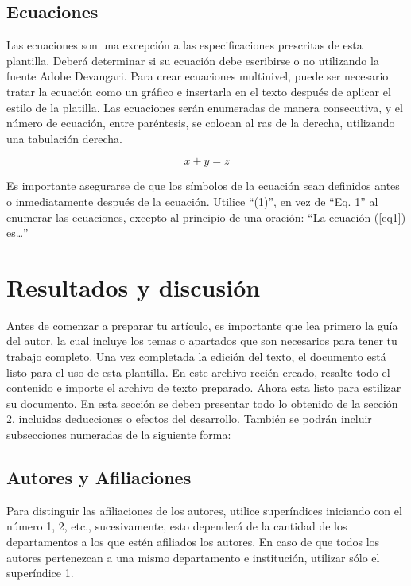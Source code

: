 \subsection{Ecuaciones}

Las ecuaciones son una excepción a las especificaciones prescritas de esta plantilla. 
Deberá determinar si su ecuación debe escribirse o no utilizando la fuente Adobe Devangari. 
Para crear ecuaciones multinivel, puede ser necesario tratar la ecuación como un gráfico e insertarla en el texto después de aplicar el estilo de la platilla.
Las ecuaciones serán enumeradas de manera consecutiva, y el número de ecuación, entre paréntesis, se colocan al ras de la derecha, utilizando una tabulación derecha. 

\begin{equation}
    \label{eq1}
    x + y = z 
\end{equation}

Es importante asegurarse de que los símbolos de la ecuación sean definidos antes o inmediatamente después de la ecuación. Utilice “(1)”, en vez de “Eq. 1” al enumerar las ecuaciones, excepto al principio de una oración: “La ecuación (\ref{eq1}) es…”

\section{Resultados y discusión}

Antes de comenzar a preparar tu artículo, es importante que lea primero la guía del autor, la cual incluye los temas o apartados que son necesarios para tener tu trabajo completo.
Una vez completada la edición del texto, el documento está listo para el uso de esta plantilla. En este archivo recién creado, resalte todo el contenido e importe el archivo de texto preparado. Ahora esta listo para estilizar su documento.
En esta sección se deben presentar todo lo obtenido de la sección 2, incluidas deducciones o efectos del desarrollo. También se podrán incluir subsecciones numeradas de la siguiente forma:

\subsection{Autores y Afiliaciones}

Para distinguir las afiliaciones de los autores, utilice superíndices iniciando con el número 1, 2, etc., sucesivamente, esto dependerá de la cantidad de los departamentos a los que estén afiliados los autores. En caso de que todos los autores pertenezcan a una mismo departamento e institución, utilizar sólo el superíndice 1. 

